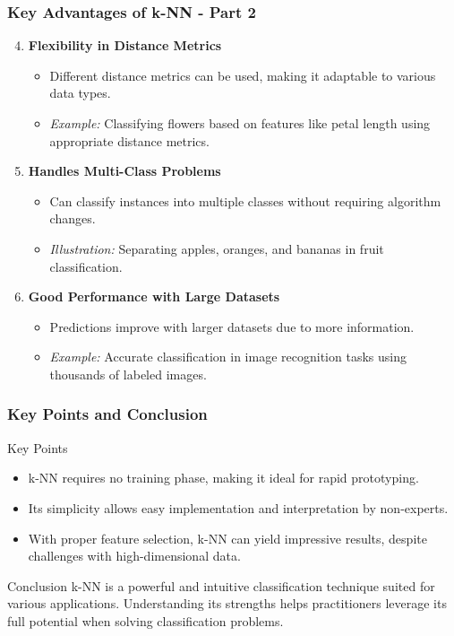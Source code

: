 \documentclass[aspectratio=169]{beamer}
\begin{document}
\begin{frame}[fragile]
    \frametitle{Key Advantages of k-NN - Part 2}
    \begin{enumerate}
        \setcounter{enumi}{3}
        \item \textbf{Flexibility in Distance Metrics}
            \begin{itemize}
                \item Different distance metrics can be used, making it adaptable to various data types.
                \item \textit{Example:} Classifying flowers based on features like petal length using appropriate distance metrics.
            \end{itemize}

        \item \textbf{Handles Multi-Class Problems}
            \begin{itemize}
                \item Can classify instances into multiple classes without requiring algorithm changes.
                \item \textit{Illustration:} Separating apples, oranges, and bananas in fruit classification.
            \end{itemize}

        \item \textbf{Good Performance with Large Datasets}
            \begin{itemize}
                \item Predictions improve with larger datasets due to more information.
                \item \textit{Example:} Accurate classification in image recognition tasks using thousands of labeled images.
            \end{itemize}
    \end{enumerate}
\end{frame}

\begin{frame}[fragile]
    \frametitle{Key Points and Conclusion}
    \begin{block}{Key Points}
        \begin{itemize}
            \item k-NN requires no training phase, making it ideal for rapid prototyping.
            \item Its simplicity allows easy implementation and interpretation by non-experts.
            \item With proper feature selection, k-NN can yield impressive results, despite challenges with high-dimensional data.
        \end{itemize}
    \end{block}

    \begin{block}{Conclusion}
        k-NN is a powerful and intuitive classification technique suited for various applications. Understanding its strengths helps practitioners leverage its full potential when solving classification problems.
    \end{block}
\end{frame}
\end{document}
